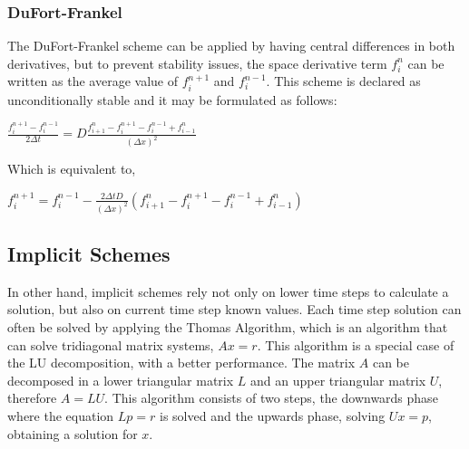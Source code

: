 \documentclass[12pt]{report}
\begin{document}
\subsubsection*{DuFort-Frankel}
\par The DuFort-Frankel scheme can be applied by having central differences in both derivatives, but to prevent stability issues, the space derivative term $f_i^n$ can be written as the average value of $f_{i}^{n + 1}$ and $f_{i}^{n - 1}$. This scheme is declared as unconditionally stable and it may be formulated as follows:
\begin{center}
\Large
$
\frac{f_i^{n + 1} - f_i^{n - 1}}{2 \Delta t} = D \frac{f_{i + 1}^{n} - f_{i}^{n + 1} - f_{i}^{n - 1} + f_{i - 1}^{n}}{(\Delta x)^2}
$
\end{center}
\par Which is equivalent to,
\begin{center}
\Large
$
f_{i}^{n + 1} = f_{i}^{n - 1} - \frac{2\Delta t D}{(\Delta x)^2} (f_{i + 1}^{n} - f_{i}^{n + 1} - f_{i}^{n - 1} + f_{i - 1}^{n})
$
\end{center}

\subsection*{Implicit Schemes}

\par In other hand, implicit schemes rely not only on lower time steps to calculate a solution, but also on current time step known values. Each time step solution can often be solved by applying the Thomas Algorithm, which is an algorithm that can solve tridiagonal matrix systems, $Ax = r$. This algorithm is a special case of the LU decomposition, with a better performance. The matrix $A$ can be decomposed in a lower triangular matrix $L$ and an upper triangular matrix $U$, therefore $A = LU$. This algorithm consists of two steps, the downwards phase where the equation $Lp = r$ is solved and the upwards phase, solving $Ux = p$, obtaining a solution for $x$. 
\end{document}

